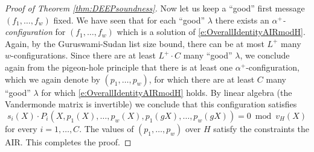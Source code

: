 \documentclass[11pt]{article}
\theoremstyle{definition}
\theoremstyle{remark}
\begin{document}
\begin{proof}[Proof of Theorem \ref{thm:DEEPsoundness}]
Now let us keep a ``good'' first message $(f_1,\ldots, f_w)$ fixed.
We have seen that for each ``good'' $\lambda$ there exists an \textit{$\alpha^+$-configuration} for $(f_1,\ldots, f_w)$ which  is a solution of \eqref{e:OverallIdentityAIRmodH}.
Again, by the Guruswami-Sudan list size bound, there can be at most $L^+$ many $w$-configurations.
Since there are at least $L^+\cdot C$ many ``good'' $\lambda$, we conclude again from the pigeon-hole principle that there is at least one $\alpha^+$-configuration, which we again denote by $(p_1,\ldots, p_w)$, for which there are at least $C$ many ``good'' $\lambda$ for which \eqref{e:OverallIdentityAIRmodH} holds.
By linear algebra (the Vandermonde matrix is invertible) we conclude that this configuration  satisfies
\[
s_i(X)\cdot P_i(X, p_1(X), \ldots, p_w(X), p_1(gX), \ldots, p_w(g X)) = 0 \bmod v_H(X)
\]
for every $i =1, \ldots, C$.
The values of $(p_1,\ldots, p_w)$ over $H$ satisfy the constraints the AIR.
This completes the proof.
%
%

\end{proof}
\end{document}
